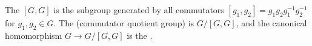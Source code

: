 The  $[G,G]$ is the subgroup generated by all commutators $[g_1, g_2] = g_1 g_2 g_1^{-1} g_2^{-1}$ for $g_1, g_2 \in G$. The  (commutator quotient group) is $G/[G,G]$, and the canonical homomorphism $G \to G/[G,G]$ is the .
